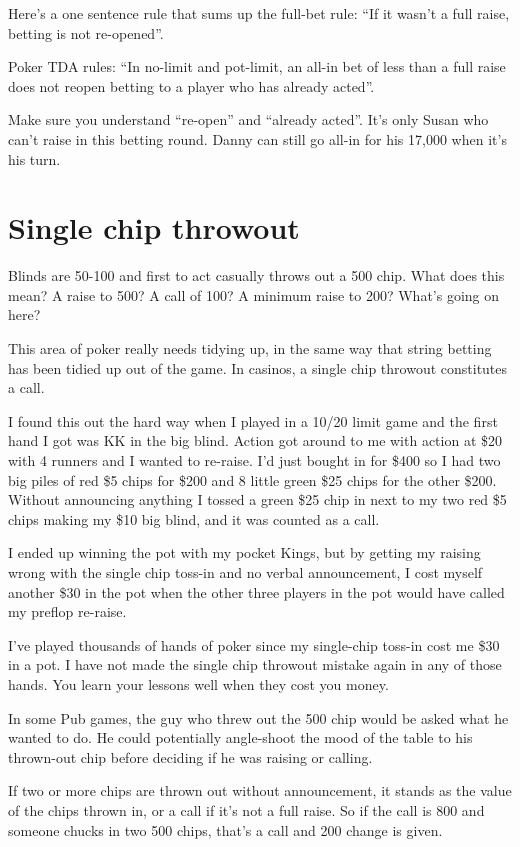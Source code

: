 Here's a one sentence rule that sums up the full-bet rule:
``If it wasn't a full raise, betting is not re-opened''.

Poker TDA rules: ``In no-limit and pot-limit, an all-in bet of less
than a full raise does not reopen betting to a player who has already
acted''.

Make sure you understand ``re-open'' and ``already acted''. It's only
Susan who can't raise in this betting round. Danny can still go all-in for
his 17,000 when it's his turn.

\section{Single chip throwout}

Blinds are 50-100 and first to act casually throws out a 500 chip.
What does this mean? A raise to 500? A call of 100? A minimum raise
to 200? What's going on here?

This area of poker really needs tidying up, in the same way that
string betting has been tidied up out of the game. In casinos, a
single chip throwout constitutes a call.

I found this out the hard way when I played in a 10/20 limit game
and the first hand I got was KK in the big blind. Action got around
to me with action at \$20 with 4 runners and I wanted to re-raise. I'd
just bought in for \$400 so I had two big piles of red \$5 chips
for \$200 and 8 little green \$25 chips for the other \$200. Without
announcing anything I tossed a green \$25 chip in next to my two red
\$5 chips making my \$10 big blind, and it was counted as a call.

I ended up winning the pot with my pocket Kings, but by getting my
raising wrong with the single chip toss-in and no verbal announcement,
I cost myself another \$30 in the pot when the other three players
in the pot would have called my preflop re-raise.

I've played thousands of hands of poker since my single-chip toss-in
cost me \$30 in a pot. I have not made the single chip throwout mistake 
again in any of those hands. You learn your lessons well when they cost 
you money.

In some Pub games, the guy who threw out the 500 chip would be asked
what he wanted to do. He could potentially angle-shoot the mood
of the table to his thrown-out chip before deciding if he was
raising or calling.

If two or more chips are thrown out without announcement, it stands
as the value of the chips thrown in, or a call if it's not a full
raise. So if the call is 800 and someone chucks in two 500 chips,
that's a call and 200 change is given.

